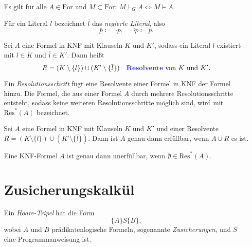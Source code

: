 \documentclass{cheat-sheet}
\newcommand{\For}{\mathrm{For}} %
\newcommand{\Res}{\mathrm{Res}} %
\begin{document}
\begin{satz}
  Es gilt für alle $A \in \For$ und $M \subset \For$: $M \vdash_G A \iff M \models A$.
\end{satz}


\begin{nota}
  Für ein Literal $l$ bezeichnet $\overline{l}$ das \emph{negierte Literal}, also
  \[ \overline{p} \coloneqq \neg p, \quad \overline{\neg p} \coloneqq p. \]
\end{nota}

\begin{defn}
  Sei $A$ eine Formel in KNF mit Klauseln $K$ und $K'$, sodass ein Literal $l$ existiert mit $l \in K$ und $\overline{l} \in K'$. Dann heißt
  \[
    R = (K \setminus \{ l \}) \cup (K' \setminus \{ \overline{l} \})
    \quad \text{\emph{Resolvente} von $K$ und $K'$.}
  \]
\end{defn}

\begin{defn}
  Ein \emph{Resolutionsschritt} fügt eine Resolvente einer Formel in KNF der Formel hinzu. Die Formel, die aus einer Formel $A$ durch mehrere Resolutionsschritte entsteht, sodass keine weiteren Resolutionsschritte möglich sind, wird mit $\Res^*(A)$ bezeichnet.
\end{defn}

\begin{lem}
  Sei $A$ eine Formel in KNF mit Klauseln $K$ und $K'$ und einer Resolvente $R = (K \setminus \{ l \}) \cup (K' \setminus \{ \overline{l} \})$. Dann ist $A$ genau dann erfüllbar, wenn $A \cup R$ es ist.
\end{lem}

\begin{satz}[Resolutionssatz]
  Eine KNF-Formel $A$ ist genau dann unerfüllbar, wenn $\emptyset \in \Res^*(A)$.
\end{satz}

\section{Zusicherungskalkül}

\begin{defn}
  Ein \emph{Hoare-Tripel} hat die Form
  \[ \{ A \} S \{ B \}, \]
  wobei $A$ und $B$ prädikatenlogische Formeln, sogenannte \emph{Zusicherungen}, und $S$ eine Programmanweisung ist.
\end{defn}
\end{document}
